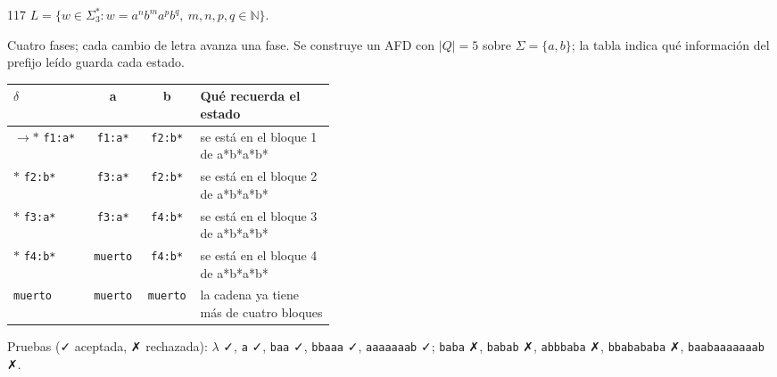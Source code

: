 \documentclass[11pt]{article}
\begin{document}
\begin{ejercicio}{117}{}
$L = \{w \in \Sigma_3^* : w = a^n b^m a^p b^q,\ m, n, p, q \in \mathbb{N}\}$.
\end{ejercicio}
\proc Cuatro fases; cada cambio de letra avanza una fase. Se construye un AFD con $|Q| = 5$ sobre $\Sigma = \{a, b\}$; la tabla indica qué información del prefijo leído guarda cada estado.
\begin{center}\small\begin{tabular}{lccp{0.42\linewidth}}\toprule
$\delta$ & a & b & Qué recuerda el estado \\\midrule
$\to$$*$ \texttt{f1:a*} & \texttt{f1:a*} & \texttt{f2:b*} & se está en el bloque 1 de a*b*a*b* \\
$*$ \texttt{f2:b*} & \texttt{f3:a*} & \texttt{f2:b*} & se está en el bloque 2 de a*b*a*b* \\
$*$ \texttt{f3:a*} & \texttt{f3:a*} & \texttt{f4:b*} & se está en el bloque 3 de a*b*a*b* \\
$*$ \texttt{f4:b*} & \texttt{muerto} & \texttt{f4:b*} & se está en el bloque 4 de a*b*a*b* \\
 \texttt{muerto} & \texttt{muerto} & \texttt{muerto} & la cadena ya tiene más de cuatro bloques \\
\bottomrule\end{tabular}\end{center}
Pruebas (✓ aceptada, ✗ rechazada): $\lambda$ ✓, \texttt{a} ✓, \texttt{baa} ✓, \texttt{bbaaa} ✓, \texttt{aaaaaaab} ✓; \texttt{baba} ✗, \texttt{babab} ✗, \texttt{abbbaba} ✗, \texttt{bbabababa} ✗, \texttt{baabaaaaaaab} ✗.
\end{document}
